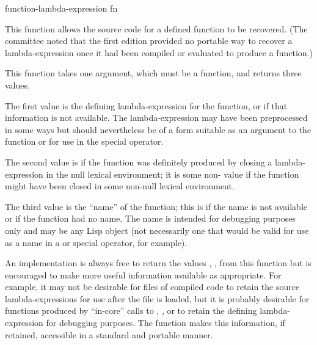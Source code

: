 \begin{defun}[Function]
function-lambda-expression fn

This function allows the
source code for a defined function to be recovered.
(The committee noted that the first edition provided no
portable way to recover a lambda-expression once it had
been compiled or evaluated to produce a function.)

This function takes one argument, which must be a function, and returns
three values.

The first value is the defining lambda-expression for the
function, or {\false} if that information is not available.
The lambda-expression may have been preprocessed in some ways
but should nevertheless be of a form suitable as an argument
to the function  or for use in the  special operator.

The second value is {\false} if the function was definitely
produced by closing
a lambda-expression in the null lexical environment; it is some
non-{\false} value if the function might have been closed in some
non-null lexical environment.

The third value is the ``name'' of the function; this is {\false} if the
name is not available or if the function had no name.
The name is intended for debugging purposes only and may be
any Lisp object (not necessarily one that would be valid for use as a name
in a  or  special operator, for example).

\beforenoterule
\begin{implementation}
An implementation is always free to return the values
{\false}, , {\false} from this function but is encouraged to
make more useful information available as appropriate.
For example, it may not be desirable for files of compiled code
to retain the source lambda-expressions for use after the file is loaded,
but it is probably desirable for
functions produced by ``in-core'' calls to ,
, or  to retain the defining lambda-expression
for debugging purposes.  The function 
makes this information, if retained, accessible in a standard and portable
manner.
\end{implementation}
\afternoterule
\end{defun}

